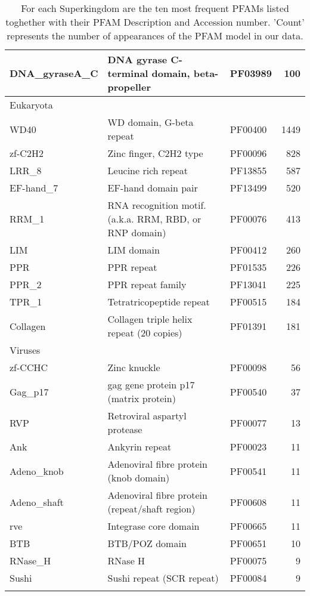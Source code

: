\documentclass[a4,center,fleqn]{NAR}
\begin{document}
\begin{table*}[t]
\begin{tabular}{lllr}
  DNA\_gyraseA\_C & DNA gyrase C-terminal domain, beta-propeller & PF03989 & 100 \\ 
   \hline
\multicolumn{4}{l}{Eukaryota}\\
WD40 & WD domain, G-beta repeat & PF00400 & 1449 \\ 
  zf-C2H2 & Zinc finger, C2H2 type & PF00096 & 828 \\ 
  LRR\_8 & Leucine rich repeat & PF13855 & 587 \\ 
  EF-hand\_7 & EF-hand domain pair & PF13499 & 520 \\ 
  RRM\_1 & RNA recognition motif. (a.k.a. RRM, RBD, or RNP domain) & PF00076 & 413 \\ 
  LIM & LIM domain & PF00412 & 260 \\ 
  PPR & PPR repeat & PF01535 & 226 \\ 
  PPR\_2 & PPR repeat family & PF13041 & 225 \\ 
  TPR\_1 & Tetratricopeptide repeat & PF00515 & 184 \\ 
  Collagen & Collagen triple helix repeat (20 copies) & PF01391 & 181 \\ 
   \hline
\multicolumn{4}{l}{Viruses}\\
zf-CCHC & Zinc knuckle & PF00098 &  56 \\ 
  Gag\_p17 & gag gene protein p17 (matrix protein) & PF00540 &  37 \\ 
  RVP & Retroviral aspartyl protease & PF00077 &  13 \\ 
  Ank & Ankyrin repeat & PF00023 &  11 \\ 
  Adeno\_knob & Adenoviral fibre protein (knob domain) & PF00541 &  11 \\ 
  Adeno\_shaft & Adenoviral fibre protein (repeat/shaft region) & PF00608 &  11 \\ 
  rve & Integrase core domain & PF00665 &  11 \\ 
  BTB & BTB/POZ domain & PF00651 &  10 \\ 
  RNase\_H & RNase H & PF00075 &   9 \\ 
  Sushi & Sushi repeat (SCR repeat) & PF00084 &   9 \\ 
   \hline
\multicolumn{4}{l}{}\\
\end{tabular}
\caption{For each Superkingdom are the ten most frequent PFAMs listed toghether with their PFAM Description and Accession number. 'Count' represents the number of appearances of the PFAM model in our data.}
\label{sup:PFAM_table}
\end{table*}
\end{document}
